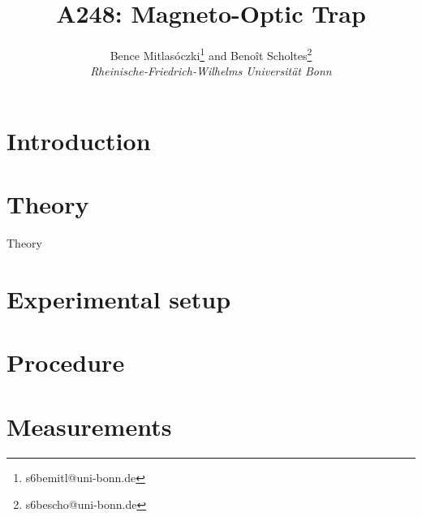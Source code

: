 \documentclass[twocolumn]{article}
\title{\textbf{A248: Magneto-Optic Trap}}
\author{Bence Mitlasóczki\thanks{s6bemitl@uni-bonn.de} and Beno\^it Scholtes\thanks{s6bescho@uni-bonn.de} \\ \textit{Rheinische-Friedrich-Wilhelms Universit\"at Bonn}}
\newcommand{\insertFigure}[1]{%
   \texttt{[image: \#1]}%
}
\begin{document}
\renewcommand{\abstractname}{\vspace{-\baselineskip}} %
\maketitle
\saythanks %
\section{Introduction}

\section{Theory}
Theory

\iffalse
\begin{figure}[!h]
\centering
\caption{A sample figure}
\label{fig:example}
\end{figure}
\fi

\section{Experimental setup} \label{sec:Exp}

\section{Procedure} \label{sec:Proc}
\section{Measurements}
\end{document}
